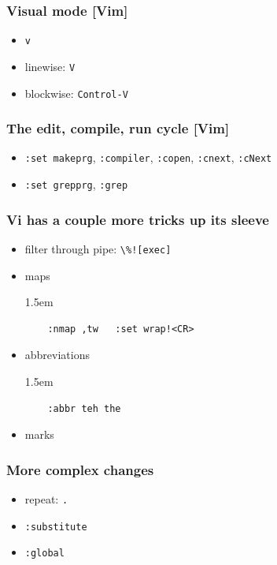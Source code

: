 \documentclass[%
        hyperref={%
                pdfauthor={Zakariyya Mughal},%
                pdfpagemode={None},pdfpagelayout={SinglePage}}%
        xcolor={x11names},%
]{beamer}
\newenvironment{indented}{\begin{adjustwidth}{1.5em}{}}{\end{adjustwidth}}
\begin{document}
\begin{frame}
\frametitle{Visual mode [Vim]}
\begin{itemize}
\item \Verb+v+
\item linewise: \Verb+V+
\item blockwise: \Verb+Control-V+
\end{itemize}
\end{frame}


\begin{frame}
\frametitle{The edit, compile, run cycle [Vim]}
\begin{itemize}
\item \Verb+:set makeprg+, \Verb+:compiler+, \Verb+:copen+,
\Verb+:cnext+, \Verb+:cNext+
\item \Verb+:set grepprg+, \Verb+:grep+
\end{itemize}
\end{frame}

\begin{frame}[fragile]
\frametitle{Vi has a couple more tricks up its sleeve}
\begin{itemize}
\item filter through pipe: \Verb+\%![exec]+
\item maps
	\begin{indented}
	\begin{Verbatim}
	:nmap ,tw	:set wrap!<CR>
	\end{Verbatim}
	\end{indented}
\item abbreviations
	\begin{indented}
	\begin{Verbatim}
	:abbr teh the
	\end{Verbatim}
	\end{indented}
\item marks
\end{itemize}
\end{frame}

\begin{frame}
\frametitle{More complex changes}
\begin{itemize}
\item repeat: \Verb+.+
\item \Verb+:substitute+
\item \Verb+:global+
\end{itemize}
\end{frame}
\end{document}
